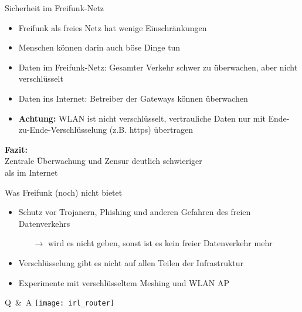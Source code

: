 \documentclass{beamer}
\begin{document}
\begin{frame}{Sicherheit im Freifunk-Netz}
\begin{itemize}
	\pause\item Freifunk als freies Netz hat wenige Einschränkungen
	\pause\item Menschen können darin auch böse Dinge tun
	\vfill
	\pause\item Daten im Freifunk-Netz: Gesamter Verkehr schwer zu überwachen, aber nicht verschlüsselt
	\pause\item Daten ins Internet: Betreiber der Gateways können überwachen
	\vfill
\pause\item \textbf{Achtung:} WLAN ist nicht verschlüsselt, vertrauliche Daten nur mit Ende-zu-Ende-Verschlüsselung (z.B. https) übertragen
\vfill
\end{itemize}
\centering
\textbf{Fazit:}\\Zentrale Überwachung und Zensur deutlich schwieriger \\ als im Internet
\end{frame}


\begin{frame}{Was Freifunk (noch) nicht bietet}
\vfill
\begin{itemize}
\pause\item Schutz vor Trojanern, Phishing und anderen Gefahren des freien Datenverkehrs
\begin{itemize}
\pause\item[$\rightarrow$] wird es nicht geben, sonst ist es kein freier Datenverkehr mehr
\end{itemize}
\vfill
\pause\item Verschlüsselung gibt es nicht auf allen Teilen der Infrastruktur
\vfill
\pause\item Experimente mit verschlüsseltem Meshing und WLAN AP
\end{itemize}
\vfill
\end{frame}

\begin{frame}{Q~\&~A}
\vfill
\centering
\texttt{[image: irl\_router]}
\vfill
\end{frame}
\end{document}
